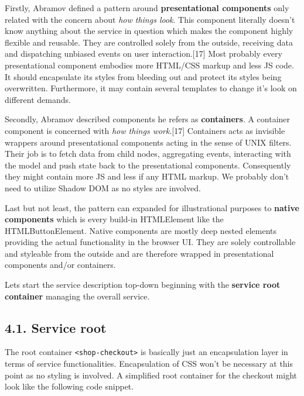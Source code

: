 \documentclass[]{article}
\begin{document}
Firstly, Abramov defined a pattern around \textbf{presentational
components} only related with the concern about \emph{how things look}.
This component literally doesn't know anything about the service in
question which makes the component highly flexible and reusable. They
are controlled solely from the outside, receiving data and dispatching
unbiased events on user interaction.{[}17{]} Most probably every
presentational component embodies more HTML/CSS markup and less JS code.
It should encapsulate its styles from bleeding out and protect its
styles being overwritten. Furthermore, it may contain several templates
to change it's look on different demands.

Secondly, Abramov described components he refers as \textbf{containers}.
A container component is concerned with \emph{how things work}.{[}17{]}
Containers acts as invisible wrappers around presentational components
acting in the sense of UNIX filters. Their job is to fetch data from
child nodes, aggregating events, interacting with the model and push
state back to the presentational components. Consequently they might
contain more JS and less if any HTML markup. We probably don't need to
utilize Shadow DOM as no styles are involved.

Last but not least, the pattern can expanded for illustrational purposes
to \textbf{native components} which is every build-in HTMLElement like
the HTMLButtonElement. Native components are mostly deep nested elements
providing the actual functionality in the browser UI. They are solely
controllable and styleable from the outside and are therefore wrapped in
presentational components and/or containers.

Lets start the service description top-down beginning with the
\textbf{service root container} managing the overall service.

\subsection{4.1. Service root}\label{service-root}

The root container \texttt{\textless{}shop-checkout\textgreater{}} is
basically just an encapsulation layer in terms of service
functionalities. Encapsulation of CSS won't be necessary at this point
as no styling is involved. A simplified root container for the checkout
might look like the following code snippet.
\end{document}
